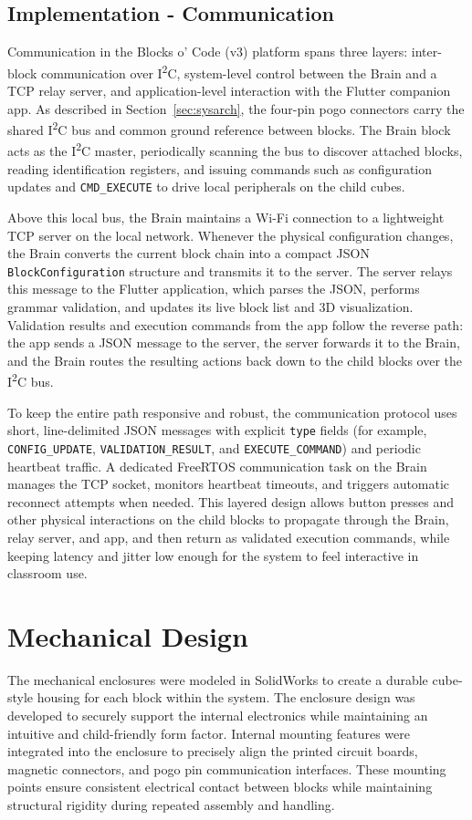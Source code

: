 \documentclass[10pt, conference]{IEEEtran}
\begin{document}
\subsection{Implementation - Communication}
Communication in the Blocks o' Code (v3) platform spans three layers: inter-block communication over I\textsuperscript{2}C, system-level control between the Brain and a TCP relay server, and application-level interaction with the Flutter companion app. As described in Section~\ref{sec:sysarch}, the four-pin pogo connectors carry the shared I\textsuperscript{2}C bus and common ground reference between blocks. The Brain block acts as the I\textsuperscript{2}C master, periodically scanning the bus to discover attached blocks, reading identification registers, and issuing commands such as configuration updates and \texttt{CMD\_EXECUTE} to drive local peripherals on the child cubes.

Above this local bus, the Brain maintains a Wi-Fi connection to a lightweight TCP server on the local network. Whenever the physical configuration changes, the Brain converts the current block chain into a compact JSON \texttt{BlockConfiguration} structure and transmits it to the server. The server relays this message to the Flutter application, which parses the JSON, performs grammar validation, and updates its live block list and 3D visualization. Validation results and execution commands from the app follow the reverse path: the app sends a JSON message to the server, the server forwards it to the Brain, and the Brain routes the resulting actions back down to the child blocks over the I\textsuperscript{2}C bus.

To keep the entire path responsive and robust, the communication protocol uses short, line-delimited JSON messages with explicit \texttt{type} fields (for example, \texttt{CONFIG\_UPDATE}, \texttt{VALIDATION\_RESULT}, and \texttt{EXECUTE\_COMMAND}) and periodic heartbeat traffic. A dedicated FreeRTOS communication task on the Brain manages the TCP socket, monitors heartbeat timeouts, and triggers automatic reconnect attempts when needed. This layered design allows button presses and other physical interactions on the child blocks to propagate through the Brain, relay server, and app, and then return as validated execution commands, while keeping latency and jitter low enough for the system to feel interactive in classroom use.


\section{Mechanical Design}
The mechanical enclosures were modeled in SolidWorks to create a durable cube-style housing for each block within the system. The enclosure design was developed to securely support the internal electronics while maintaining an intuitive and child-friendly form factor. Internal mounting features were integrated into the enclosure to precisely align the printed circuit boards, magnetic connectors, and pogo pin communication interfaces. These mounting points ensure consistent electrical contact between blocks while maintaining structural rigidity during repeated assembly and handling.
\end{document}
